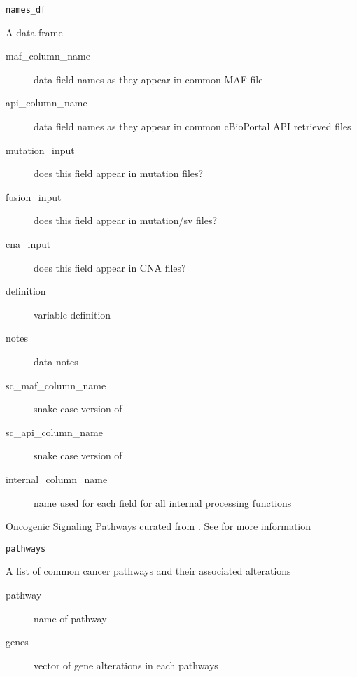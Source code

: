 \documentclass[a4paper]{book}
\begin{document}
%
\begin{Usage}
\begin{verbatim}
names_df
\end{verbatim}
\end{Usage}
%
\begin{Format}
A data frame
\begin{description}

\item[maf\_column\_name] data field names as they appear in common MAF file
\item[api\_column\_name] data field names as they appear in common cBioPortal API retrieved files
\item[mutation\_input] does this field appear in mutation files?
\item[fusion\_input] does this field appear in mutation/sv files?
\item[cna\_input] does this field appear in CNA files?
\item[definition] variable definition
\item[notes] data notes
\item[sc\_maf\_column\_name] snake case version of 
\item[sc\_api\_column\_name] snake case version of 
\item[internal\_column\_name] name used for each field for all internal processing functions

\end{description}

\end{Format}
%
\begin{Description}\relax
Oncogenic Signaling Pathways curated from .
See  for more information
\end{Description}
%
\begin{Usage}
\begin{verbatim}
pathways
\end{verbatim}
\end{Usage}
%
\begin{Format}
A list of common cancer pathways and their associated alterations
\begin{description}

\item[pathway] name of pathway
\item[genes] vector of gene alterations in each pathways

\end{description}

\end{Format}
\end{document}
